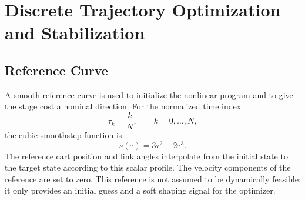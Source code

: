 \documentclass[conference]{IEEEtran}
\begin{document}

\section{Discrete Trajectory Optimization and Stabilization}
\subsection{Reference Curve}
A smooth reference curve is used to initialize the nonlinear program and to give the stage cost a nominal direction. For the normalized time index
\begin{equation}
\tau_k=\frac{k}{N},\qquad k=0,\ldots,N,
\end{equation}
the cubic smoothstep function is
\begin{equation}
s(\tau)=3\tau^2-2\tau^3 .
\end{equation}
The reference cart position and link angles interpolate from the initial state to the target state according to this scalar profile. The velocity components of the reference are set to zero. This reference is not assumed to be dynamically feasible; it only provides an initial guess and a soft shaping signal for the optimizer.
\end{document}
